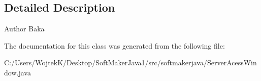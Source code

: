 \subsection{Detailed Description}
\begin{DoxyAuthor}{Author}
Baka 
\end{DoxyAuthor}


The documentation for this class was generated from the following file\+:\begin{DoxyCompactItemize}
\item 
C\+:/\+Users/\+Wojtek\+K/\+Desktop/\+Soft\+Maker\+Java1/src/softmakerjava/Server\+Acess\+Window.\+java\end{DoxyCompactItemize}
